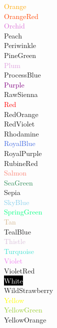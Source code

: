 \documentclass[12pt]{article}
\begin{document}
	\textcolor{Orange}{Orange}\\
	\textcolor{OrangeRed}{OrangeRed}\\
	\textcolor{Orchid}{Orchid}\\
	\textcolor{Peach}{Peach}\\
	\textcolor{Periwinkle}{Periwinkle}\\
	\textcolor{PineGreen}{PineGreen}\\
	\textcolor{Plum}{Plum}\\
	\textcolor{ProcessBlue}{ProcessBlue}\\
	\textcolor{Purple}{Purple}\\
	\textcolor{RawSienna}{RawSienna}\\
	\textcolor{Red}{Red}\\
	\textcolor{RedOrange}{RedOrange}\\
	\textcolor{RedViolet}{RedViolet}\\
	\textcolor{Rhodamine}{Rhodamine}\\
	\textcolor{RoyalBlue}{RoyalBlue}\\
	\textcolor{RoyalPurple}{RoyalPurple}\\
	\textcolor{RubineRed}{RubineRed}\\
	\textcolor{Salmon}{Salmon}\\
	\textcolor{SeaGreen}{SeaGreen}\\
	\textcolor{Sepia}{Sepia}\\
	\textcolor{SkyBlue}{SkyBlue}\\
	\textcolor{SpringGreen}{SpringGreen}\\
	\textcolor{Tan}{Tan}\\
	\textcolor{TealBlue}{TealBlue}\\
	\textcolor{Thistle}{Thistle}\\
	\textcolor{Turquoise}{Turquoise}\\
	\textcolor{Violet}{Violet}\\
	\textcolor{VioletRed}{}VioletRed\\
	\colorbox{black}{\textcolor{White}{White}}\\
	\textcolor{WildStrawberry}{WildStrawberry}\\
	\textcolor{Yellow}{Yellow}\\
	\textcolor{YellowGreen}{YellowGreen}\\
	\textcolor{YellowOrange}{YellowOrange}\\
\end{document}
